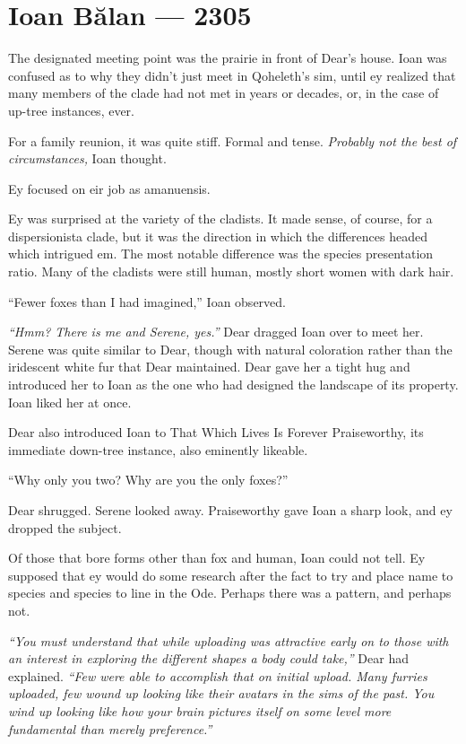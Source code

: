 \hypertarget{ioan-bux103lan-2305}{%
\chapter*{Ioan Bălan — 2305}\label{ioan-bux103lan-2305}}

The designated meeting point was the prairie in front of Dear's house. Ioan was confused as to why they didn't just meet in Qoheleth's sim, until ey realized that many members of the clade had not met in years or decades, or, in the case of up-tree instances, ever.

For a family reunion, it was quite stiff. Formal and tense. \emph{Probably not the best of circumstances,} Ioan thought.

Ey focused on eir job as amanuensis.

Ey was surprised at the variety of the cladists. It made sense, of course, for a dispersionista clade, but it was the direction in which the differences headed which intrigued em. The most notable difference was the species presentation ratio. Many of the cladists were still human, mostly short women with dark hair.

``Fewer foxes than I had imagined,'' Ioan observed.

\emph{``Hmm? There is me and Serene, yes.''} Dear dragged Ioan over to meet her. Serene was quite similar to Dear, though with natural coloration rather than the iridescent white fur that Dear maintained. Dear gave her a tight hug and introduced her to Ioan as the one who had designed the landscape of its property. Ioan liked her at once.

Dear also introduced Ioan to That Which Lives Is Forever Praiseworthy, its immediate down-tree instance, also eminently likeable.

``Why only you two? Why are you the only foxes?''

Dear shrugged. Serene looked away. Praiseworthy gave Ioan a sharp look, and ey dropped the subject.

Of those that bore forms other than fox and human, Ioan could not tell. Ey supposed that ey would do some research after the fact to try and place name to species and species to line in the Ode. Perhaps there was a pattern, and perhaps not.

\emph{``You must understand that while uploading was attractive early on to those with an interest in exploring the different shapes a body could take,''} Dear had explained. \emph{``Few were able to accomplish that on initial upload. Many furries uploaded, few wound up looking like their avatars in the sims of the past. You wind up looking like how your brain pictures itself on some level more fundamental than merely preference.''}

